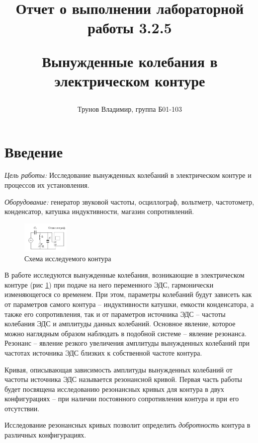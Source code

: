 \documentclass[10pt,a4paper]{article}
\title{
Отчет о выполнении лабораторной работы 3.2.5

Вынужденные колебания в электрическом контуре
}
\author{
\vspace{20 cm}
Трунов Владимир, группа Б01-103}
\begin{document}
\maketitle

\newpage

	\section{Введение}
	
	\textit{Цель работы:} Исследование вынужденных колебаний в электрическом контуре и процессов их установления.
	
	\textit{Оборудование:} генератор звуковой частоты, осциллограф, вольтметр, частотометр, конденсатор, катушка индуктивности, магазин сопротивлений.
	
	\begin{figure}
		\vspace{-0.5cm}
		\centering
		\includegraphics[width = 0.2\textwidth]{schem_of_circuit}
		\caption{Схема исследуемого контура}
		\label{fig:schem_of_circuit}
	\end{figure}
	
	В работе исследуются вынужденные колебания, возникающие в электрическом контуре (рис \ref{fig:schem_of_circuit}) при подаче на него переменного ЭДС, гармонически изменяющегося со временем. При этом, параметры колебаний будут зависеть как от параметров самого контура -- индуктивности катушки, емкости конденсатора, а также его сопротивления, так и от параметров источника ЭДС -- частоты колебания ЭДС и амплитуды данных колебаний. Основное явление, которое можно наглядным образом наблюдать в подобной системе -- явление резонанса. Резонанс -- явление резкого увеличения амплитуды вынужденных колебаний при частотах источника ЭДС близких к собственной частоте контура.
	
	Кривая, описывающая зависимость амплитуды вынужденных колебаний от частоты источника ЭДС называется резонансной кривой. Первая часть работы будет посвящена исследованию резонансных кривых для контура в двух конфигурациях -- при наличии постоянного сопротивления контура и при его отсутствии.
	
	Исследование резонансных кривых позволит определить \textit{добротность} контура в различных конфигурациях. 
	
\end{document}

